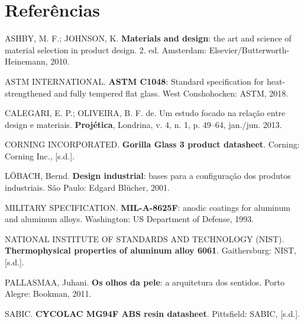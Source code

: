\documentclass[
  12pt,
  a4paper,
  oneside,
  brazil,
  chapter=TITLE
]{article}
\newcommand{\secbreak}{\clearpage}
\let\oldsection\section
\renewcommand{\section}{\secbreak\oldsection}
\begin{document}
\section{Referências}\label{referencias}

\noindent
ASHBY, M. F.; JOHNSON, K. \textbf{Materials and design}: the art and science of material
selection in product design. 2. ed. Amsterdam: Elsevier/Butterworth-Heinemann, 2010.

\bigskip\noindent
ASTM INTERNATIONAL. \textbf{ASTM C1048}: Standard specification for heat-strengthened and
fully tempered flat glass. West Conshohocken: ASTM, 2018.

\bigskip\noindent
CALEGARI, E. P.; OLIVEIRA, B. F. de. Um estudo focado na relação entre design e materiais.
\textbf{Projética}, Londrina, v. 4, n. 1, p. 49--64, jan./jun. 2013.

\bigskip\noindent
CORNING INCORPORATED. \textbf{Gorilla Glass 3 product datasheet}. Corning: Corning Inc.,
[s.d.].

\bigskip\noindent
LÖBACH, Bernd. \textbf{Design industrial}: bases para a configuração dos produtos
industriais. São Paulo: Edgard Blücher, 2001.

\bigskip\noindent
MILITARY SPECIFICATION. \textbf{MIL-A-8625F}: anodic coatings for aluminum and aluminum
alloys. Washington: US Department of Defense, 1993.

\bigskip\noindent
NATIONAL INSTITUTE OF STANDARDS AND TECHNOLOGY (NIST). \textbf{Thermophysical properties
of aluminum alloy 6061}. Gaithersburg: NIST, [s.d.].

\bigskip\noindent
PALLASMAA, Juhani. \textbf{Os olhos da pele}: a arquitetura dos sentidos. Porto Alegre:
Bookman, 2011.

\bigskip\noindent
SABIC. \textbf{CYCOLAC MG94F ABS resin datasheet}. Pittsfield: SABIC, [s.d.].
\end{document}
